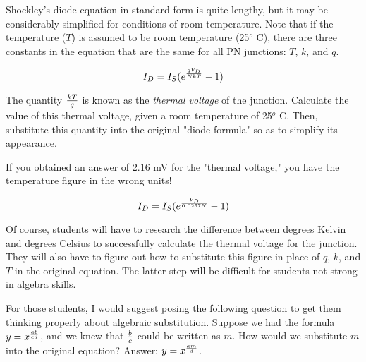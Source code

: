 

Shockley's diode equation in standard form is quite lengthy, but it may be considerably simplified for conditions of room temperature.  Note that if the temperature ($T$) is assumed to be room temperature (25$^{o}$ C), there are three constants in the equation that are the same for all PN junctions: $T$, $k$, and $q$.

$$I_D = I_S (e^{qV_D \over NkT} - 1)$$

The quantity $kT \over q$ is known as the {\it thermal voltage} of the junction.  Calculate the value of this thermal voltage, given a room temperature of 25$^{o}$ C.  Then, substitute this quantity into the original "diode formula" so as to simplify its appearance.







If you obtained an answer of 2.16 mV for the "thermal voltage," you have the temperature figure in the wrong units!

$$I_D = I_S (e^{V_D \over {0.0257 N}} - 1)$$







Of course, students will have to research the difference between degrees Kelvin and degrees Celsius to successfully calculate the thermal voltage for the junction.  They will also have to figure out how to substitute this figure in place of $q$, $k$, and $T$ in the original equation.  The latter step will be difficult for students not strong in algebra skills.

For those students, I would suggest posing the following question to get them thinking properly about algebraic substitution.  Suppose we had the formula $y = x^{ab \over cd}$, and we knew that $b \over c$ could be written as $m$.  How would we substitute $m$ into the original equation?  Answer: $y = x^{am \over d}$.




